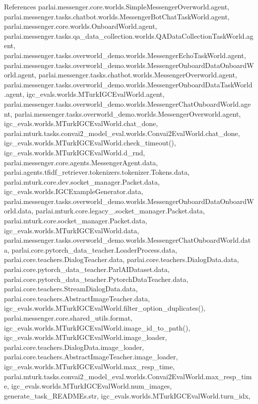 References parlai.\+messenger.\+core.\+worlds.\+Simple\+Messenger\+Overworld.\+agent, parlai.\+messenger.\+tasks.\+chatbot.\+worlds.\+Messenger\+Bot\+Chat\+Task\+World.\+agent, parlai.\+messenger.\+core.\+worlds.\+Onboard\+World.\+agent, parlai.\+messenger.\+tasks.\+qa\+\_\+data\+\_\+collection.\+worlds.\+Q\+A\+Data\+Collection\+Task\+World.\+agent, parlai.\+messenger.\+tasks.\+overworld\+\_\+demo.\+worlds.\+Messenger\+Echo\+Task\+World.\+agent, parlai.\+messenger.\+tasks.\+overworld\+\_\+demo.\+worlds.\+Messenger\+Onboard\+Data\+Onboard\+World.\+agent, parlai.\+messenger.\+tasks.\+chatbot.\+worlds.\+Messenger\+Overworld.\+agent, parlai.\+messenger.\+tasks.\+overworld\+\_\+demo.\+worlds.\+Messenger\+Onboard\+Data\+Task\+World.\+agent, igc\+\_\+evals.\+worlds.\+M\+Turk\+I\+G\+C\+Eval\+World.\+agent, parlai.\+messenger.\+tasks.\+overworld\+\_\+demo.\+worlds.\+Messenger\+Chat\+Onboard\+World.\+agent, parlai.\+messenger.\+tasks.\+overworld\+\_\+demo.\+worlds.\+Messenger\+Overworld.\+agent, igc\+\_\+evals.\+worlds.\+M\+Turk\+I\+G\+C\+Eval\+World.\+chat\+\_\+done, parlai.\+mturk.\+tasks.\+convai2\+\_\+model\+\_\+eval.\+worlds.\+Convai2\+Eval\+World.\+chat\+\_\+done, igc\+\_\+evals.\+worlds.\+M\+Turk\+I\+G\+C\+Eval\+World.\+check\+\_\+timeout(), igc\+\_\+evals.\+worlds.\+M\+Turk\+I\+G\+C\+Eval\+World.\+d\+\_\+rnd, parlai.\+messenger.\+core.\+agents.\+Messenger\+Agent.\+data, parlai.\+agents.\+tfidf\+\_\+retriever.\+tokenizers.\+tokenizer.\+Tokens.\+data, parlai.\+mturk.\+core.\+dev.\+socket\+\_\+manager.\+Packet.\+data, igc\+\_\+evals.\+worlds.\+I\+G\+C\+Example\+Generator.\+data, parlai.\+messenger.\+tasks.\+overworld\+\_\+demo.\+worlds.\+Messenger\+Onboard\+Data\+Onboard\+World.\+data, parlai.\+mturk.\+core.\+legacy\+\_.\+socket\+\_\+manager.\+Packet.\+data, parlai.\+mturk.\+core.\+socket\+\_\+manager.\+Packet.\+data, igc\+\_\+evals.\+worlds.\+M\+Turk\+I\+G\+C\+Eval\+World.\+data, parlai.\+messenger.\+tasks.\+overworld\+\_\+demo.\+worlds.\+Messenger\+Chat\+Onboard\+World.\+data, parlai.\+core.\+pytorch\+\_\+data\+\_\+teacher.\+Loader\+Process.\+data, parlai.\+core.\+teachers.\+Dialog\+Teacher.\+data, parlai.\+core.\+teachers.\+Dialog\+Data.\+data, parlai.\+core.\+pytorch\+\_\+data\+\_\+teacher.\+Parl\+A\+I\+Dataset.\+data, parlai.\+core.\+pytorch\+\_\+data\+\_\+teacher.\+Pytorch\+Data\+Teacher.\+data, parlai.\+core.\+teachers.\+Stream\+Dialog\+Data.\+data, parlai.\+core.\+teachers.\+Abstract\+Image\+Teacher.\+data, igc\+\_\+evals.\+worlds.\+M\+Turk\+I\+G\+C\+Eval\+World.\+filter\+\_\+option\+\_\+duplicates(), parlai.\+messenger.\+core.\+shared\+\_\+utils.\+format, igc\+\_\+evals.\+worlds.\+M\+Turk\+I\+G\+C\+Eval\+World.\+image\+\_\+id\+\_\+to\+\_\+path(), igc\+\_\+evals.\+worlds.\+M\+Turk\+I\+G\+C\+Eval\+World.\+image\+\_\+loader, parlai.\+core.\+teachers.\+Dialog\+Data.\+image\+\_\+loader, parlai.\+core.\+teachers.\+Abstract\+Image\+Teacher.\+image\+\_\+loader, igc\+\_\+evals.\+worlds.\+M\+Turk\+I\+G\+C\+Eval\+World.\+max\+\_\+resp\+\_\+time, parlai.\+mturk.\+tasks.\+convai2\+\_\+model\+\_\+eval.\+worlds.\+Convai2\+Eval\+World.\+max\+\_\+resp\+\_\+time, igc\+\_\+evals.\+worlds.\+M\+Turk\+I\+G\+C\+Eval\+World.\+num\+\_\+images, generate\+\_\+task\+\_\+\+R\+E\+A\+D\+M\+Es.\+str, igc\+\_\+evals.\+worlds.\+M\+Turk\+I\+G\+C\+Eval\+World.\+turn\+\_\+idx, 